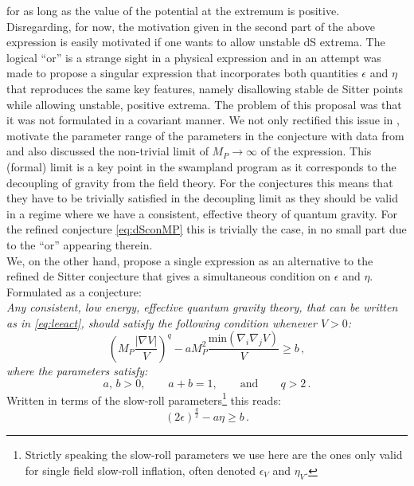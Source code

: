 \documentclass[12pt]{report}
\newcommand{\be}{\begin{equation}}
\newcommand{\ee}{\end{equation}}
\begin{document}
for as long as the value of the potential at the extremum is positive. Disregarding, for now, the motivation given in \cite{Ooguri:2018wrx} the second part of the above expression is easily motivated if one wants to allow unstable dS extrema. The logical ``or'' is a strange sight in a physical expression and in \cite{Andriot:2018wzk} an attempt was made to propose a singular expression that incorporates both quantities $\epsilon$ and $\eta$ that reproduces the same key features, namely disallowing stable de Sitter points while allowing unstable, positive extrema. The problem of this proposal was that it was not formulated in a covariant manner. We not only rectified this issue in \cite{Andriot:2018mav}, motivate the parameter range of the parameters in the conjecture with data from \cite{Roupec:2018mbn} and also discussed the non-trivial limit of $M_P \to \infty$ of the expression. This (formal) limit is a key point in the swampland program as it corresponds to the decoupling of gravity from the field theory. For the conjectures this means that they have to be trivially satisfied in the decoupling limit as they should be valid in a regime where we have a consistent, effective theory of quantum gravity. For the refined conjecture \eqref{eq:dSconMP} this is trivially the case, in no small part due to the ``or'' appearing therein.\\
We, on the other hand, propose a single expression as an alternative to the refined de Sitter conjecture that gives a simultaneous condition on $\epsilon$ and $\eta$. Formulated as a conjecture:\\
\emph{Any consistent, low energy, effective quantum gravity theory, that can be written as in \eqref{eq:leeact}, should satisfy the following condition whenever $V>0$:}
\be 
\left(M_P \frac{|\nabla V|}{V}\right)^ q - a M_P^2 \frac{\text{min}(\nabla_i \nabla_j V)}{V} \geq b\,,
\label{eq:ourdScon}
\ee
\emph{where the parameters satisfy:}
\be 
a,\, b > 0,\qquad a+b = 1, \qquad \text{and}\qquad q>2\,.
\ee
Written in terms of the slow-roll parameters\footnote{Strictly speaking the slow-roll parameters we use here are the ones only valid for single field slow-roll inflation, often denoted $\epsilon_V$ and $\eta_V$.} this reads:
\be 
(2\epsilon)^ {\frac{q}{2}} - a \eta \geq b\,.
\label{eq:ourdSconslowroll}
\ee
\end{document}
